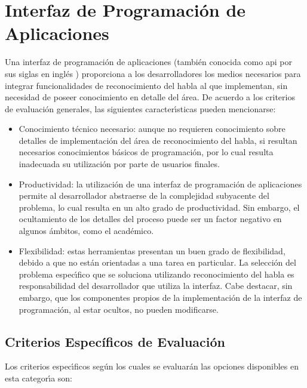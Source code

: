 \section{Interfaz de Programaci\'on de Aplicaciones}
\label{apis}


Una interfaz de programaci\'on de aplicaciones (tambi\'en conocida como \gls{api} por sus siglas en ingl\'es 
)
proporciona a los desarrolladores los medios necesarios para integrar funcionalidades de
reconocimiento del habla al  que implementan, sin necesidad de poseer
conocimiento en detalle del \'area. De acuerdo a los criterios de evaluaci\'on generales, las
siguientes caracter{\'\i}sticas pueden mencionarse:

\begin{itemize}
 	\item Conocimiento t\'ecnico necesario: aunque no requieren conocimiento sobre detalles de implementaci\'on
 	del \'area de reconocimiento del habla, si resultan necesarios conocimientos b\'asicos de
 	programaci\'on, por lo cual resulta inadecuada su utilizaci\'on por parte de usuarios finales.
 	\item Productividad: la utilizaci\'on de una interfaz de programaci\'on de aplicaciones permite
 	al desarrollador abstraerse de la complejidad subyacente del problema, lo cual resulta en
 	un alto grado de productividad. Sin embargo, el ocultamiento de los detalles del proceso
 	puede ser un factor negativo en algunos \'ambitos, como el acad\'emico.
 	\item Flexibilidad: estas herramientas presentan un buen grado de flexibilidad, debido a
 	que no est\'an orientadas a una tarea en particular. La selecci\'on del problema espec{\'\i}fico
 	que se soluciona utilizando reconocimiento del habla es responsabilidad del desarrollador
 	que utiliza la interfaz. Cabe destacar, sin embargo, que los componentes propios de la
 	implementaci\'on de la interfaz de programaci\'on, al estar ocultos, no
 	pueden modificarse.
 \end{itemize}


\subsection{Criterios Espec\'ificos de Evaluaci\'on}

Los criterios espec{\'\i}ficos seg\'un los cuales se evaluar\'an las opciones disponibles en esta
categor{\'\i}a son:

